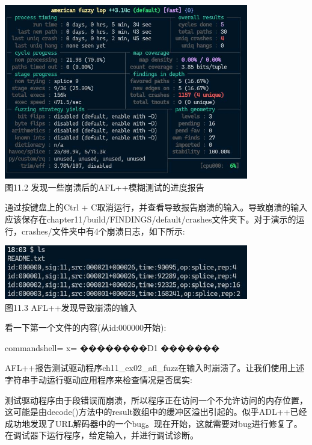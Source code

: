\begin{center}
\includegraphics[width=0.8\textwidth]{content/2/chapter11/images/2.jpg}\\
图11.2 发现一些崩溃后的AFL++模糊测试的进度报告
\end{center}

通过按键盘上的Ctrl + C取消运行，并查看导致报告崩溃的输入。导致崩溃的输入应该保存在chapter11/build/FINDINGS/default/crashes文件夹下。对于演示的运行，crashes/文件夹中有4个崩溃日志，如下所示:

\begin{center}
\includegraphics[width=0.8\textwidth]{content/2/chapter11/images/3.jpg}\\
图11.3 AFL++发现导致崩溃的输入
\end{center}

看一下第一个文件的内容(从id:000000开始):

\begin{tcblisting}{commandshell={}}
x=%
��������D1%
�������%
\end{tcblisting}

AFL++报告测试驱动程序ch11\_ex02\_afl\_fuzz在输入时崩溃了。让我们使用上述字符串手动运行驱动应用程序来检查情况是否属实:


测试驱动程序由于段错误而崩溃，所以程序正在访问一个不允许访问的内存位置，这可能是由decode()方法中的result数组中的缓冲区溢出引起的。似乎ADL++已经成功地发现了URL解码器中的一个bug。现在开始，这就需要对bug进行修复了。在调试器下运行程序，给定输入，并进行调试诊断。







